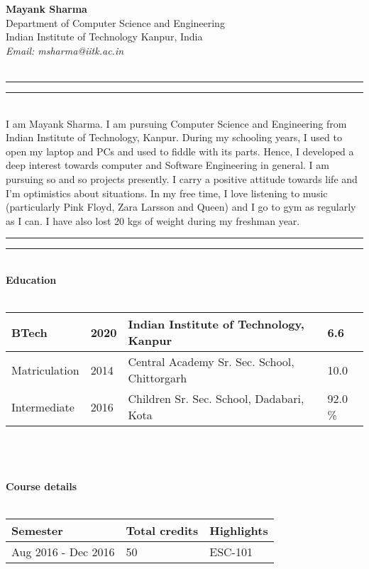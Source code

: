\documentclass{article}
\begin{document}
\begin{flushleft}
	\textbf{Mayank Sharma}\\
	Department of Computer Science and Engineering\\
	Indian 	Institute of Technology Kanpur, India\\
	\textit{Email:  msharma@iitk.ac.in}\\
	\hfill\\
	\hrule
	\vspace{0.8mm}
	\hrule
	\hfill\\
	\vspace{0.8mm}
	I am Mayank Sharma. I am pursuing Computer Science and Engineering from Indian Institute of Technology, Kanpur. During my schooling years, I used to open my laptop and PCs and used to fiddle with its parts. Hence, I developed a deep interest towards computer and Software Engineering in general.
	I am pursuing so and so projects presently.
	I carry a positive attitude towards life and I'm optimistics about situations. In my free time, I love listening to music (particularly Pink Floyd, Zara Larsson and Queen) and I go to gym as regularly as I can. I have also lost 20 kgs of weight during my freshman year.
	\vspace{3mm}
	\hfill\\
	\hrule
	\vspace{0.8mm}
	\hrule
	\hfill\\
	\textbf{Education}\\
	\hfill\\
	\begin{tabular}{|l|l|l|l|}
		\hline
		BTech & 2020 & Indian Institute of Technology, Kanpur & 6.6\\
		\hline
		Matriculation & 2014 & Central Academy Sr. Sec. School, Chittorgarh & 10.0\\
		\hline
		Intermediate & 2016 & Children Sr. Sec. School, Dadabari, Kota & 92.0 \%\\
		\hline
	\end{tabular}
	\hfill\\
	\hfill\\
	\hfill\\
	\textbf{Course details}\\
	\hfill\\
	\begin{tabular}{|l|l|l|}
		\hline
		\textbf{Semester} & \textbf{Total credits} & \textbf{Highlights}\\
		\hline
		Aug 2016 - Dec 2016 & 50 & ESC-101\\
		\hline

\end{tabular}
\end{flushleft}
\end{document}
